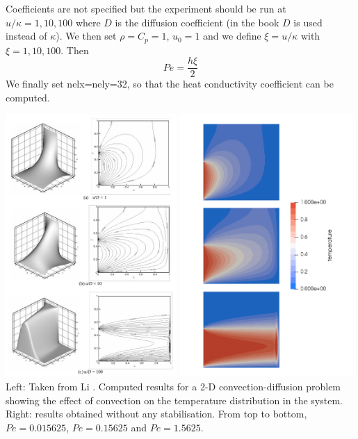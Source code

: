 Coefficients are not specified but the experiment should be run at $u/\kappa=1,10,100$ where 
$D$ is the diffusion coefficient (in the book $D$ is used instead of $\kappa$).
We then set $\rho=C_p=1$, $u_0=1$ and we define $\xi=u/\kappa$ with $\xi=1,10,100$. Then 
\[
Pe = \frac{h\xi}{2} 
\]
We finally set nelx=nely=32, so that the heat conductivity coefficient can be computed.


\begin{center}
\includegraphics[height=10cm]{python_codes/fieldstone_65/results/exp3/libook}
\includegraphics[height=10cm]{python_codes/fieldstone_65/results/exp3/Tnostab}\\
{\captionfont Left: Taken from Li \cite{li06}. Computed results for a 2-D convection-diffusion 
problem showing the effect of convection on the temperature distribution in the system.
Right: results obtained without any stabilisation. From top to bottom, $Pe=0.015625$, 
$Pe=0.15625$ and $Pe=1.5625$.}
\end{center}

